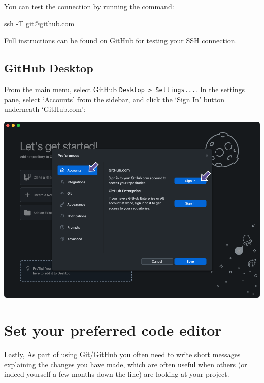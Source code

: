 \documentclass[
  letterpaper,
  DIV=11,
  numbers=noendperiod]{scrartcl}
\newenvironment{Shaded}{\begin{snugshade}}{\end{snugshade}}
\newcommand{\NormalTok}[1]{\textcolor[rgb]{0.00,0.23,0.31}{#1}}
\newcommand{\SpecialCharTok}[1]{\textcolor[rgb]{0.37,0.37,0.37}{#1}}
\begin{document}
You can test the connection by running the command:

\begin{Shaded}
\begin{Highlighting}[]
\NormalTok{ ssh }\SpecialCharTok{{-}}\NormalTok{T git}\SpecialCharTok{@}\NormalTok{github.com}
\end{Highlighting}
\end{Shaded}

Full instructions can be found on GitHub for
\href{https://docs.github.com/en/authentication/connecting-to-github-with-ssh/testing-your-ssh-connection}{testing
your SSH connection}.

\subsection{GitHub Desktop}

From the main menu, select GitHub
\texttt{Desktop\ \textgreater{}\ Settings...}. In the settings pane,
select `Accounts' from the sidebar, and click the `Sign In' button
underneath `GitHub.com':

\includegraphics{images/image5.png}

\section{Set your preferred code
editor}\label{set-your-preferred-code-editor}

Lastly, As part of using Git/GitHub you often need to write short
messages explaining the changes you have made, which are often useful
when others (or indeed yourself a few months down the line) are looking
at your project.
\end{document}
